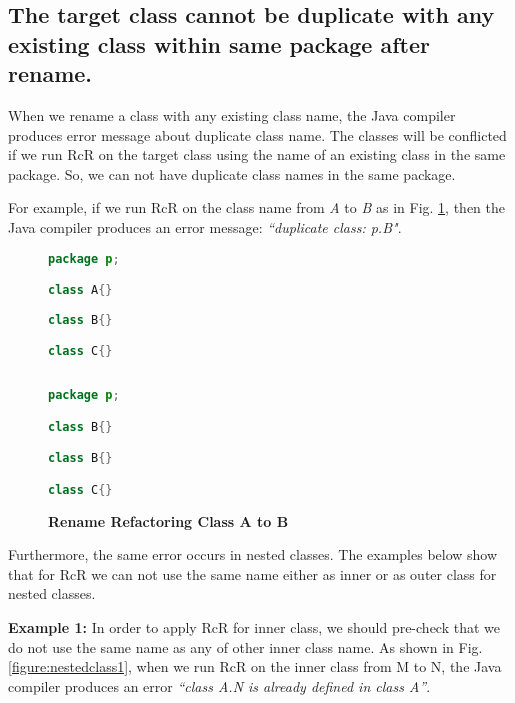 \subsection{The target class cannot be duplicate with any existing class within same package after rename.}

When we rename a class with any existing class name, the Java compiler produces error message about duplicate class name. The classes will be conflicted if we run RcR on the target class using the name of an existing class in the same package. So, we can not have duplicate class names in the same package. 

For example, if we run RcR on the class name from \textsl{A} to \textsl{B} as in Fig. \ref{fig:afterrr}, then the Java compiler produces an error message: \textit{``duplicate class: p.B"}.

\begin{figure}[th]
\centering
\begin{minipage}[t]{0.45\linewidth}
\begin{lstlisting}[language=java, basicstyle=\scriptsize\ttfamily,frame=single]
package p;

class A{}
	
class B{}

class C{}
 
\end{lstlisting}
\end{minipage}
\hfill
\begin{minipage}[t]{0.45\linewidth}
\begin{lstlisting}[language=java, basicstyle=\scriptsize\ttfamily,frame=single]
package p;

class B{}	

class B{}

class C{}

\end{lstlisting}
\end{minipage}
\caption{\textbf{Rename Refactoring Class A to B}}
\label{fig:afterrr}
\end{figure}


Furthermore, the same error occurs in nested classes. The examples below show that for RcR we can not use the same name either as inner or as outer class for nested classes.


\textbf{Example 1:} In order to apply RcR for inner class, we should pre-check that we do not use the same name as any of other inner class name. As shown in Fig. \ref{figure:nestedclass1}, when we run RcR on the inner class from M to N, the Java compiler produces an error \textit{``class A.N is already defined in class A''}. 

